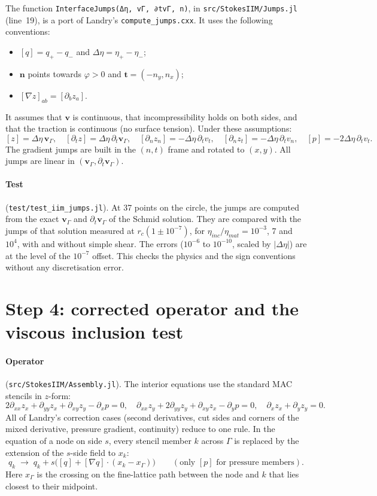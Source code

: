 \documentclass[11pt,a4paper]{article}
\newcommand{\code}[1]{\texttt{#1}}
\begin{document}
The function \code{InterfaceJumps(Δη, vΓ, ∂tvΓ, n)}, in \code{src/StokesIIM/Jumps.jl}
(line~19), is a port of Landry's \code{compute\_jumps.cxx}. It uses the following conventions:
\begin{itemize}
  \item $[q]=q_+-q_-$ and $\Delta\eta=\eta_+-\eta_-$;
  \item $\mathbf n$ points towards $\varphi>0$ and $\mathbf t=(-n_y,n_x)$;
  \item $[\nabla z]_{ab}=[\partial_b z_a]$.
\end{itemize}
It assumes that $\mathbf v$ is continuous, that incompressibility holds on both sides, and that
the traction is continuous (no surface tension). Under these assumptions:
\[
[z]=\Delta\eta\,\mathbf v_\Gamma,\quad
[\partial_t z]=\Delta\eta\,\partial_t\mathbf v_\Gamma,\quad
[\partial_n z_n]=-\Delta\eta\,\partial_t v_t,\quad
[\partial_n z_t]=-\Delta\eta\,\partial_t v_n,\quad
[p]=-2\Delta\eta\,\partial_t v_t.
\]
The gradient jumps are built in the $(n,t)$ frame and rotated to $(x,y)$. All jumps are linear
in $(\mathbf v_\Gamma,\partial_t\mathbf v_\Gamma)$.

\paragraph{Test} (\code{test/test\_iim\_jumps.jl}). At 37 points on the circle, the jumps are
computed from the exact $\mathbf v_\Gamma$ and $\partial_t\mathbf v_\Gamma$ of the Schmid
solution. They are compared with the jumps of that solution measured at $r_c(1\pm10^{-7})$, for
$\eta_{inc}/\eta_{mat}=10^{-3}$, 7 and $10^4$, with and without simple shear. The errors
($10^{-6}$ to $10^{-10}$, scaled by $|\Delta\eta|$) are at the level of the $10^{-7}$ offset.
This checks the physics and the sign conventions without any discretisation error.

\section{Step 4: corrected operator and the viscous inclusion test}\label{sec:s4}

\paragraph{Operator} (\code{src/StokesIIM/Assembly.jl}). The interior equations use the
standard MAC stencils in $z$-form:
\[
2\partial_{xx}z_x+\partial_{yy}z_x+\partial_{xy}z_y-\partial_xp=0,\quad
\partial_{xx}z_y+2\partial_{yy}z_y+\partial_{xy}z_x-\partial_yp=0,\quad
\partial_xz_x+\partial_yz_y=0.
\]
All of Landry's correction cases (second derivatives, cut sides and corners of the mixed
derivative, pressure gradient, continuity) reduce to one rule. In the equation of a node on side
$s$, every stencil member $k$ across $\Gamma$ is replaced by the extension of the $s$-side field
to $x_k$:
\[
q_k\;\to\;q_k+s\bigl([q]+[\nabla q]\cdot(x_k-x_\Gamma)\bigr)
\qquad(\text{only }[p]\text{ for pressure members}).
\]
Here $x_\Gamma$ is the crossing on the fine-lattice path between the node and $k$ that lies
closest to their midpoint.
\end{document}
